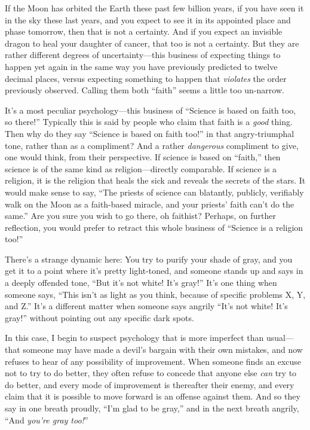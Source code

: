 {
 If the Moon has orbited the Earth these past few billion years, if
you have seen it in the sky these last years, and you expect to see it
in its appointed place and phase tomorrow, then that is not a
certainty. And if you expect an invisible dragon to heal your daughter
of cancer, that too is not a certainty. But they are rather different
degrees of uncertainty---this business of expecting things to happen
yet again in the same way you have previously predicted to twelve
decimal places, versus expecting something to happen that
\textit{violates} the order previously observed. Calling them both
``faith'' seems a little too
un-narrow.}

{
 It's a most peculiar psychology---this business of
``Science is based on faith too, so
there!'' Typically this is said by people who claim
that faith is a \textit{good} thing. Then why do they say
``Science is based on faith too!''
in that angry-triumphal tone, rather than as a compliment? And a rather
\textit{dangerous} compliment to give, one would think, from their
perspective. If science is based on
``faith,'' then science is of the
same kind as religion---directly comparable. If science is a religion,
it is the religion that heals the sick and reveals the secrets of the
stars. It would make sense to say, ``The priests of
science can blatantly, publicly, verifiably walk on the Moon as a
faith-based miracle, and your priests' faith
can't do the same.'' Are you sure you
wish to go there, oh faithist? Perhaps, on further reflection, you
would prefer to retract this whole business of
``Science is a religion too!''}

{
 There's a strange dynamic here: You try to purify
your shade of gray, and you get it to a point where
it's pretty light-toned, and someone stands up and says
in a deeply offended tone, ``But it's
not white! It's gray!''
It's one thing when someone says,
``This isn't as light as you think,
because of specific problems X, Y, and Z.''
It's a different matter when someone says angrily
``It's not white! It's
gray!'' without pointing out any specific dark
spots.}

{
 In this case, I begin to suspect psychology that is more imperfect
than usual---that someone may have made a devil's
bargain with their own mistakes, and now refuses to hear of any
possibility of improvement. When someone finds an excuse not to try to
do better, they often refuse to concede that anyone else \textit{can}
try to do better, and every mode of improvement is thereafter their
enemy, and every claim that it is possible to move forward is an
offense against them. And so they say in one breath proudly,
``I'm glad to be
gray,'' and in the next breath angrily,
``And \textit{you're gray
too!}''}

